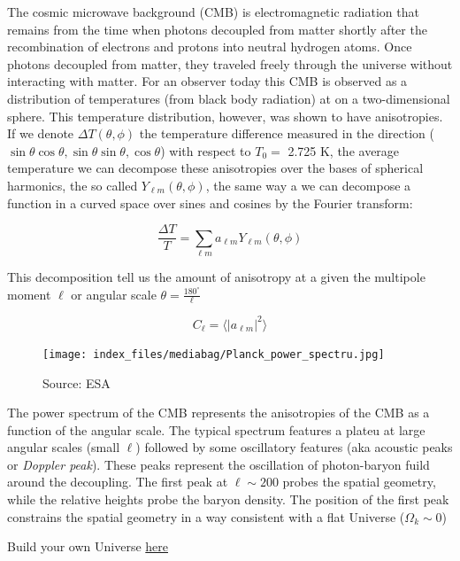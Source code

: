\documentclass[
  letterpaper,
  DIV=11,
  numbers=noendperiod]{scrreprt}
\begin{document}
The cosmic microwave background (CMB) is electromagnetic radiation that
remains from the time when photons decoupled from matter shortly after
the recombination of electrons and protons into neutral hydrogen atoms.
Once photons decoupled from matter, they traveled freely through the
universe without interacting with matter. For an observer today this CMB
is observed as a distribution of temperatures (from black body
radiation) at on a two-dimensional sphere. This temperature
distribution, however, was shown to have anisotropies. If we denote
\(\Delta T (\theta, \phi)\) the temperature difference measured in the
direction
(\(\sin\theta \cos \theta, \sin\theta \sin\theta , \cos\theta\)) with
respect to \(T_0 =\) 2.725 K, the average temperature we can decompose
these anisotropies over the bases of spherical harmonics, the so called
\(Y_{\ell m} (\theta, \phi)\), the same way a we can decompose a
function in a curved space over sines and cosines by the Fourier
transform:

\[\frac{\Delta T}{T} = \sum_{\ell m} a_{\ell m} Y_{\ell m} (\theta, \phi)\]

This decomposition tell us the amount of anisotropy at a given the
multipole moment \(\ell\) or angular scale
\(\theta = \frac{180^{\circ}}{\ell}\)

\[C_\ell = \langle |a_{\ell m}|^2 \rangle\]

\begin{figure}[H]

{\centering \texttt{[image: index\_files/mediabag/Planck\_power\_spectru.jpg]}

}

\caption{Source: ESA}

\end{figure}%

The power spectrum of the CMB represents the anisotropies of the CMB as
a function of the angular scale. The typical spectrum features a plateu
at large angular scales (small \(\ell\)) followed by some oscillatory
features (aka acoustic peaks or \emph{Doppler peak}). These peaks
represent the oscillation of photon-baryon fuild around the decoupling.
The first peak at \(\ell \sim 200\) probes the spatial geometry, while
the relative heights probe the baryon density. The position of the first
peak constrains the spatial geometry in a way consistent with a flat
Universe (\(\Omega_k \sim 0\))

\begin{tcolorbox}[enhanced jigsaw, colframe=quarto-callout-note-color-frame, opacitybacktitle=0.6, left=2mm, leftrule=.75mm, opacityback=0, colbacktitle=quarto-callout-note-color!10!white, breakable, bottomrule=.15mm, toprule=.15mm, colback=white, coltitle=black, bottomtitle=1mm, toptitle=1mm, titlerule=0mm, title=\textcolor{quarto-callout-note-color}{\faInfo}\hspace{0.5em}{Note}, arc=.35mm, rightrule=.15mm]

Build your own Universe
\href{https://lambda.gsfc.nasa.gov/education/cmb_plotter/}{here}

\end{tcolorbox}
\end{document}
